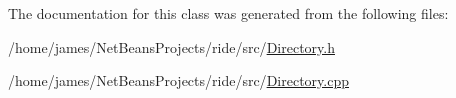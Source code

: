 The documentation for this class was generated from the following files\-:\begin{DoxyCompactItemize}
\item 
/home/james/\-Net\-Beans\-Projects/ride/src/\hyperlink{_directory_8h}{Directory.\-h}\item 
/home/james/\-Net\-Beans\-Projects/ride/src/\hyperlink{_directory_8cpp}{Directory.\-cpp}\end{DoxyCompactItemize}
